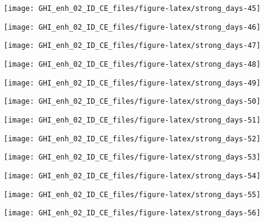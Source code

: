 \documentclass[
  10pt,
  a4paper,oneside]{article}
\begin{document}
\begin{center}\texttt{[image: GHI\_enh\_02\_ID\_CE\_files/figure-latex/strong\_days-45]} \end{center}

\begin{center}\texttt{[image: GHI\_enh\_02\_ID\_CE\_files/figure-latex/strong\_days-46]} \end{center}

\begin{center}\texttt{[image: GHI\_enh\_02\_ID\_CE\_files/figure-latex/strong\_days-47]} \end{center}

\begin{center}\texttt{[image: GHI\_enh\_02\_ID\_CE\_files/figure-latex/strong\_days-48]} \end{center}

\begin{center}\texttt{[image: GHI\_enh\_02\_ID\_CE\_files/figure-latex/strong\_days-49]} \end{center}

\begin{center}\texttt{[image: GHI\_enh\_02\_ID\_CE\_files/figure-latex/strong\_days-50]} \end{center}

\begin{center}\texttt{[image: GHI\_enh\_02\_ID\_CE\_files/figure-latex/strong\_days-51]} \end{center}

\begin{center}\texttt{[image: GHI\_enh\_02\_ID\_CE\_files/figure-latex/strong\_days-52]} \end{center}

\begin{center}\texttt{[image: GHI\_enh\_02\_ID\_CE\_files/figure-latex/strong\_days-53]} \end{center}

\begin{center}\texttt{[image: GHI\_enh\_02\_ID\_CE\_files/figure-latex/strong\_days-54]} \end{center}

\begin{center}\texttt{[image: GHI\_enh\_02\_ID\_CE\_files/figure-latex/strong\_days-55]} \end{center}

\begin{center}\texttt{[image: GHI\_enh\_02\_ID\_CE\_files/figure-latex/strong\_days-56]} \end{center}
\end{document}
